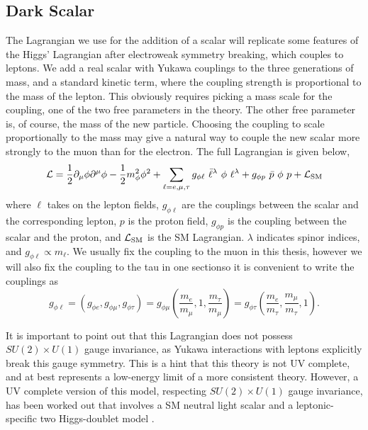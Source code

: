\subsection{Dark Scalar}
The Lagrangian we use for the addition of a scalar will replicate some features of the Higgs' Lagrangian after electroweak symmetry breaking, which couples to leptons.
We add a real scalar with Yukawa couplings to the three generations of mass, and a standard kinetic term, where the coupling strength is proportional to the mass of the lepton.
This obviously requires picking a mass scale for the coupling, one of the two free parameters in the theory.
The other free parameter is, of course, the mass of the new particle.
Choosing the coupling to scale proportionally to the mass may give a natural way to couple the new scalar more strongly to the muon than for the electron.
The full Lagrangian is given below,
\begin{equation}
\label{eqn:scalar_lagrangian}
\operatorname{\mathcal{L}} = \frac{1}{2}\partial_\mu \phi \partial^\mu \phi - \frac{1}{2} m_\phi^2 \phi^2 + \sum_{\ell=e,\mu,\tau} g_{\phi \ell}~\bar{\ell}^\lambda~\phi~\ell^\lambda + g_{\phi p}~\bar{p}~\phi~p + \operatorname{\mathcal{L}}_{\textrm{SM}}
\end{equation}
where $\ell$ takes on the lepton fields, $g_{\phi \ell}$ are the couplings between the scalar and the corresponding lepton, $p$ is the proton field, $g_{\phi p}$ is the coupling between the scalar and the proton, and $\operatorname{\mathcal{L}}_\textrm{SM}$ is the SM Lagrangian.
$\lambda$ indicates spinor indices, and $g_{\phi \ell} \propto m_\ell$.
We usually fix the coupling to the muon in this thesis, however we will also fix the coupling to the tau in one sectionso it is convenient to write the couplings as
\begin{equation}
\label{eqn:coupling_mass}
g_{\phi \ell} = \left(g_{\phi e}, g_{\phi \mu}, g_{\phi \tau}\right) = g_{\phi \mu} \left( \frac{m_e}{m_\mu}, 1, \frac{m_\tau}{m_\mu} \right) = g_{\phi \tau} \left( \frac{m_e}{m_\tau}, \frac{m_\mu}{m_\tau}, 1 \right)\textrm{.}
\end{equation}

It is important to point out that this Lagrangian does not possess $SU(2) \times U(1)$ gauge invariance, as Yukawa interactions with leptons explicitly break this gauge symmetry. 
This is a hint that this theory is not UV complete, and at best represents a low-energy limit of a more consistent theory.
However, a UV complete version of this model, respecting $SU(2) \times U(1)$ gauge invariance, has been worked out that involves a SM neutral light scalar and a leptonic-specific two Higgs-doublet model \cite{Batell:2015unpub}.


